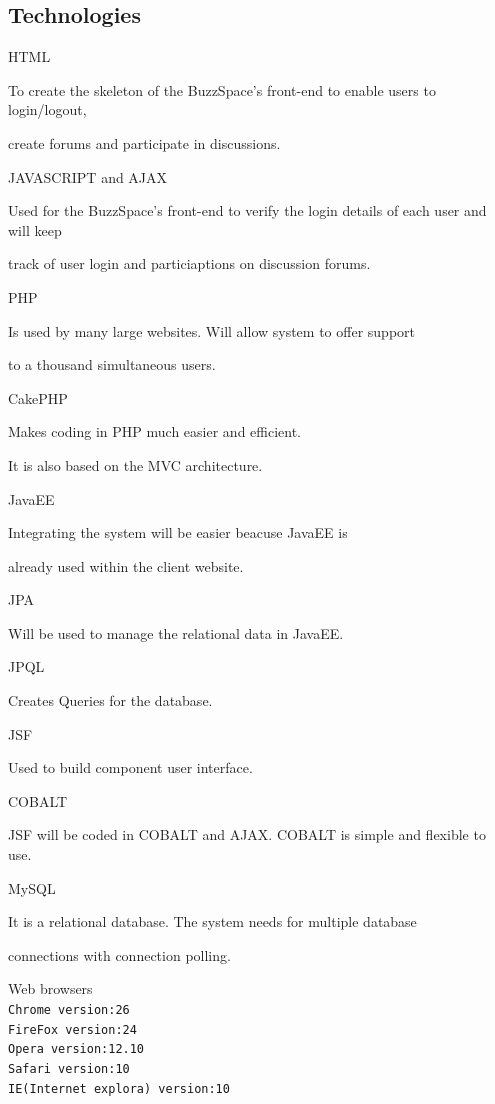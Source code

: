 \documentclass[a4paper,12pt]{report}
\begin{document}
\subsection{Technologies}
	\begin{description}
\item[$\bullet$] HTML
\item To create the skeleton of the BuzzSpace's front-end to enable users to login/logout,
\item create forums and participate in discussions.
\item [$\bullet$] JAVASCRIPT and  AJAX
\item Used for the BuzzSpace's front-end to verify the login details of each user and will keep 
\item track of user login and particiaptions on discussion forums.
\item [$\bullet$] PHP
\item Is used by many large websites. Will allow system to offer support 
\item to a thousand simultaneous users.
\newpage
\item [$\bullet$] CakePHP
\item Makes coding in PHP much easier and efficient. 
\item It is also based on the MVC architecture.
\item [$\bullet$] JavaEE
\item Integrating the system will be easier beacuse JavaEE is 
\item already used within the client website.
\item [$\bullet$] JPA
\item Will be used to manage the relational data in JavaEE.
\item [$\bullet$] JPQL
\item Creates Queries for the database.
\item [$\bullet$] JSF
\item Used to build component user interface.
\item [$\bullet$] COBALT
\item JSF will be coded in COBALT and AJAX. COBALT is simple and flexible to use.
\item [$\bullet$] MySQL
\item It is a relational database. The system needs for multiple database 
\item connections with connection polling.
\item [$\bullet$] Web browsers\\
\texttt{Chrome version:26}\\
\texttt{FireFox version:24}\\
\texttt{Opera version:12.10}\\
\texttt{Safari version:10}\\
\texttt{IE(Internet explora) version:10}
\end{description}
\end{document}

